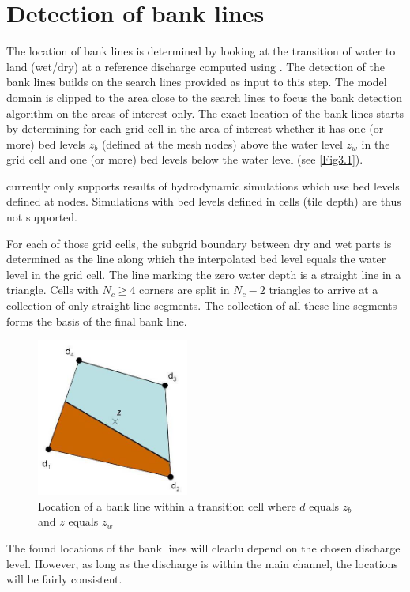 \chapter{Detection of bank lines} \label{Chp3}

The location of bank lines is determined by looking at the transition of water to land (wet/dry) at a reference discharge computed using \dflowfm.
The detection of the bank lines builds on the search lines provided as input to this step.
The model domain is clipped to the area close to the search lines to focus the bank detection algorithm on the areas of interest only.
The exact location of the bank lines starts by determining for each grid cell in the area of interest whether it has one (or more) bed levels $z_b$ (defined at the mesh nodes) above the water level $z_w$ in the grid cell and one (or more) bed levels below the water level (see \autoref{Fig3.1}).

\Note \dfastbe currently only supports results of hydrodynamic simulations which use bed levels defined at nodes.
Simulations with bed levels defined in cells (tile depth) are thus not supported.

For each of those grid cells, the subgrid boundary between dry and wet parts is determined as the line along which the interpolated bed level equals the water level in the grid cell.
The line marking the zero water depth is a straight line in a triangle.
Cells with $N_c \ge 4$ corners are split in $N_c - 2$ triangles to arrive at a collection of only straight line segments.
The collection of all these line segments forms the basis of the final bank line.

\begin{figure}
\includegraphics[width=5cm]{figures/Fig3-1.png}
\caption{Location of a bank line within a transition cell where $d$ equals $z_b$ and $z$ equals $z_w$}
\label{Fig3.1}
\end{figure}

The found locations of the bank lines will clearlu depend on the chosen discharge level.
However, as long as the discharge is within the main channel, the locations will be fairly consistent.

